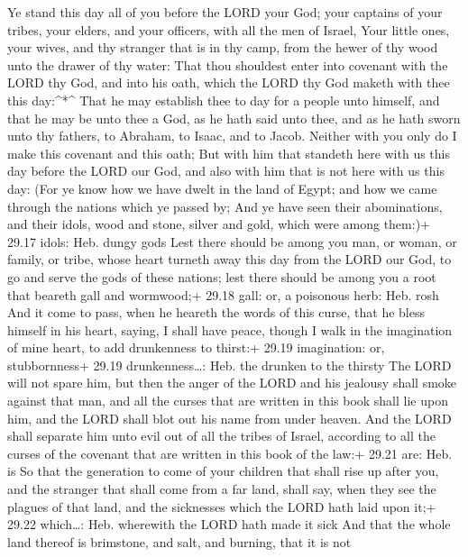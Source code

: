  Ye stand this day all of you before the LORD your God;
your captains of your tribes, your elders, and your officers, with all
the men of Israel,  Your little ones, your wives, and thy
stranger that is in thy camp, from the hewer of thy wood unto the drawer
of thy water:  That thou shouldest enter into covenant with
the LORD thy God, and into his oath, which the LORD thy God maketh with
thee this day:\^{}*\^{}  That he may establish thee to day
for a people unto himself, and that he may be unto thee a God, as he
hath said unto thee, and as he hath sworn unto thy fathers, to Abraham,
to Isaac, and to Jacob.  Neither with you only do I make
this covenant and this oath;  But with him that standeth
here with us this day before the LORD our God, and also with him that is
not here with us this day:  (For ye know how we have dwelt
in the land of Egypt; and how we came through the nations which ye
passed by;  And ye have seen their abominations, and their
idols, wood and stone, silver and gold, which were among them:)+ 29.17
idols: Heb. dungy gods  Lest there should be among you man,
or woman, or family, or tribe, whose heart turneth away this day from
the LORD our God, to go and serve the gods of these nations; lest there
should be among you a root that beareth gall and wormwood;+ 29.18 gall:
or, a poisonous herb: Heb. rosh  And it come to pass, when
he heareth the words of this curse, that he bless himself in his heart,
saying, I shall have peace, though I walk in the imagination of mine
heart, to add drunkenness to thirst:+ 29.19 imagination: or,
stubbornness+ 29.19 drunkenness\ldots: Heb. the drunken to the thirsty
 The LORD will not spare him, but then the anger of the
LORD and his jealousy shall smoke against that man, and all the curses
that are written in this book shall lie upon him, and the LORD shall
blot out his name from under heaven.  And the LORD shall
separate him unto evil out of all the tribes of Israel, according to all
the curses of the covenant that are written in this book of the law:+
29.21 are: Heb. is  So that the generation to come of your
children that shall rise up after you, and the stranger that shall come
from a far land, shall say, when they see the plagues of that land, and
the sicknesses which the LORD hath laid upon it;+ 29.22 which\ldots:
Heb. wherewith the LORD hath made it sick  And that the
whole land thereof is brimstone, and salt, and burning, that it is not
